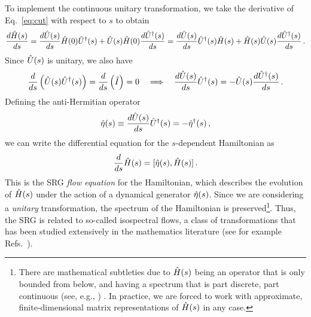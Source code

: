 {To implement the continuous unitary transformation, we take the derivative of
Eq.~\eqref{eq:cut} with respect to $s$ to obtain 
\begin{equation}
   \frac{d {\hat{H}(s)}} {d {s}}  =  \frac{d {\hat{U}(s)}} {d {s}} \hat{H}(0)\hat{U}^\dag(s) + \hat{U}(s)\hat{H}(0) \frac{d {\hat{U}^\dag(s)}} {d {s}} 
                   =  \frac{d {\hat{U}(s)}} {d {s}} \hat{U}^\dag(s)\hat{H}(s) + \hat{H}(s)\hat{U}(s) \frac{d {\hat{U}^\dag(s)}} {d {s}} \,.
\end{equation}
Since $\hat{U}(s)$ is  unitary, we also have
\begin{equation}
   \frac{d {}} {d {s}} \left(\hat{U}(s)\hat{U}^\dag(s)\right) =  \frac{d {}} {d {s}}  \left(\hat{I}\right) = 0 \quad \Longrightarrow 
  \quad  \frac{d {\hat{U}(s)}} {d {s}} \hat{U}^\dag(s) = - \hat{U}(s) \frac{d {\hat{U}^\dag(s)}} {d {s}} \,.
\end{equation}
Defining the anti-Hermitian operator
\begin{equation}\label{eq:def_eta}
  \etaO(s) \equiv \totd{\UO(s)}{s} \UUO(s) = - \eetaO(s)\,,
\end{equation}
we can write the differential equation for the $s$-dependent Hamiltonian as
\begin{equation} \label{eq:opflow}
  \totd{}{s} \HO(s) = \comm{\etaO(s)}{\HO(s)}\,.
\end{equation}
This is the SRG \emph{flow equation} for the Hamiltonian, which describes the 
evolution of $\hat{H}(s)$ under the action of a dynamical generator $\hat{\eta}(s)$. 
Since we are considering a \emph{unitary} transformation, the spectrum of the 
Hamiltonian is preserved\footnote{There are mathematical subtleties due to 
$\hat{H}(s)$ being an operator that is only bounded from below, and having a 
spectrum that is part discrete, part continuous (see, e.g., \cite{Bach:2010zr,Boutin:2016ef})
. In practice, we are forced
to work with approximate, finite-dimensional matrix representations of $\hat{H}(s)$
in any case.}. Thus, the SRG is related to so-called isospectral flows, a class 
of transformations that has been studied extensively in the mathematics literature 
(see for example Refs.~\cite{Brockett:1991kx,Chu:1994vn,Chu:1995ys,Bach:2010zr,Boutin:2016ef}).

}
